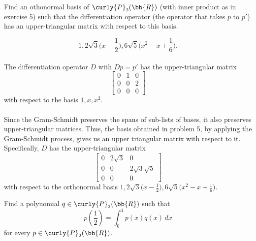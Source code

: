 \documentclass[12pt, letterpaper]{hmcpset}
\begin{document}
\pagebreak

\begin{problem}[6]
	Find an othonormal basis of $\curly{P}_2(\bb{R})$ (with inner product as in exercise 5) such that the differentiation operator (the operator that takes $p$ to $p'$) has an upper-triangular matrix with respect to this basis.
\end{problem}

\begin{solution}
	\[
		\boxed{
			1, 2 \sqrt 3 \Big ( x - \frac{1}{2} \Big ), 6 \sqrt 5 \Big ( x^2 - x + \frac{1}{6} \Big ).
		}
	\] \\
	The differentiation operator $D$ with $D p = p'$ has the upper-triangular matrix
	\[
		\begin{bmatrix}
			0 & 1 & 0 \\
			0 & 0 & 2 \\
			0 & 0 & 0
		\end{bmatrix}
	\]
	with respect to the basis $1, x, x^2$. \\\\
	Since the Gram-Schmidt preserves the spans of sub-lists of bases, it also preserves upper-triangular matrices. Thus, the basis obtained in problem 5, by applying the Gram-Schmidt process, gives us an upper triangular matrix with respect to it. Specifically, $D$ has the upper-triangular matrix
	\[
		\begin{bmatrix}
			0 & 2 \sqrt 3 & 0 \\
			0 & 0 & 2 \sqrt 3 \sqrt 5 \\
			0 & 0 & 0
		\end{bmatrix}
	\]
	with respect to the orthonormal basis $1, 2 \sqrt 3 \Big ( x - \frac{1}{2} \Big ), 6 \sqrt 5 \Big ( x^2 - x + \frac{1}{6} \Big )$.
\end{solution}

\pagebreak

\begin{problem}[7]
	Find a polynomial $q \in \curly{P}_2(\bb{R})$ such that
	\[
		p(\frac{1}{2}) = \int_0^1 p(x) q(x) \, dx
	\]
	for every $p \in \curly{P}_2(\bb{R})$.
\end{problem}
\end{document}
